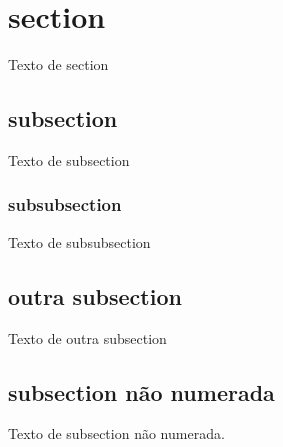 \documentclass{article}
\begin{document}
\section{section}

Texto de section

\subsection{subsection}

Texto de subsection

\subsubsection{subsubsection}

Texto de subsubsection

\subsection{outra subsection}

Texto de outra subsection

\subsection*{subsection não numerada}

Texto de subsection não numerada.
	
\end{document}
